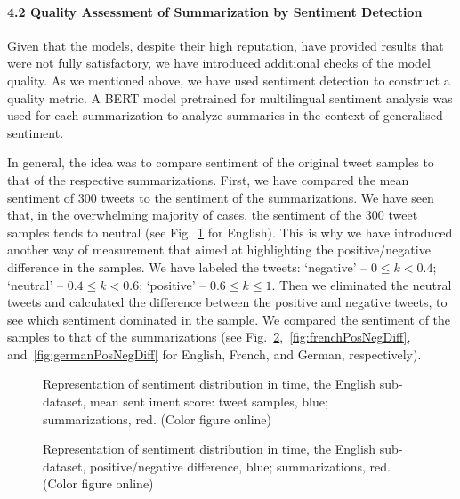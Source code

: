 \paragraph{4.2 Quality Assessment of Summarization by Sentiment Detection}

Given that the models, despite their high reputation, have provided results that were not fully satisfactory, we have introduced additional checks of the model quality. As we mentioned above, we have used sentiment detection to construct a quality metric. A BERT model \cite{JoulinGraveBojanowski} pretrained for multilingual sentiment analysis was used for each summarization to analyze summaries in the context of generalised sentiment.

In general, the idea was to compare sentiment of the original tweet samples to that of the respective summarizations. First, we have compared the mean sentiment of 300 tweets to the sentiment of the summarizations. We have seen that, in the overwhelming majority of cases, the sentiment of the 300 tweet samples tends to neutral (see Fig.~\cref{fig:englishMeanSentiment} for English). This is why we have introduced another way of measurement that aimed at highlighting the positive/negative difference in the samples. We have labeled the tweets: ‘negative’ -- \(0 \le k < 0.4\); ‘neutral’ -- \(0.4 \le k < 0.6\); ‘positive’ -- \(0.6 \le k \le 1\). Then we eliminated the neutral tweets and calculated the difference between the positive and negative tweets, to see which sentiment dominated in the sample. We compared the sentiment of the samples to that of the summarizations (see Fig.~\cref{fig:englishPosNegDiff},~\cref{fig:frenchPosNegDiff}, and~\cref{fig:germanPosNegDiff} for English, French, and German, respectively).

\begin{figure}[ht]
	\caption{Representation of sentiment distribution in time, the English sub-dataset, mean sent iment score: tweet samples, blue; summarizations, red. (Color figure online)}\label{fig:englishMeanSentiment}
\end{figure}

\begin{figure}[ht]
	\caption{Representation of sentiment distribution in time, the English sub-dataset, positive/negative difference, blue; summarizations, red. (Color figure online)}\label{fig:englishPosNegDiff}
\end{figure}

